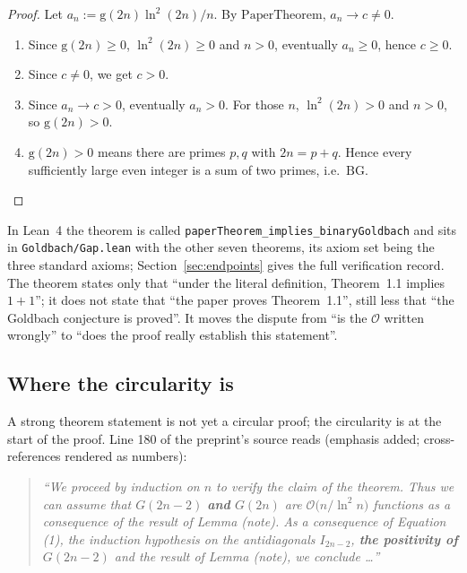 \documentclass[11pt,a4paper]{article}
\theoremstyle{plain}
\theoremstyle{definition}
\newcommand{\BG}{\mathrm{BG}}
\newcommand{\PaperTheorem}{\mathrm{PaperTheorem}}
\newcommand{\gcount}{\mathrm{g}}
\begin{document}
\begin{proof}
Let $a_n:=\gcount(2n)\ln^2(2n)/n$. By $\PaperTheorem$, $a_n\to c\ne0$.

\begin{enumerate}[label=(\roman*)]
\item Since $\gcount(2n)\ge0$, $\ln^2(2n)\ge0$ and $n>0$, eventually $a_n\ge0$, hence $c\ge0$.
\item Since $c\ne0$, we get $c>0$.
\item Since $a_n\to c>0$, eventually $a_n>0$. For those $n$, $\ln^2(2n)>0$ and $n>0$, so $\gcount(2n)>0$.
\item $\gcount(2n)>0$ means there are primes $p,q$ with $2n=p+q$. Hence every sufficiently large even integer is a sum of two primes, i.e.\ $\BG$.
\end{enumerate}
\end{proof}

In Lean~4 the theorem is called \texttt{paperTheorem\_implies\_binaryGoldbach} and sits in \texttt{Goldbach/Gap.lean} with the other seven theorems, its axiom set being the three standard axioms; Section~\ref{sec:endpoints} gives the full verification record. The theorem states only that ``under the literal definition, Theorem~1.1 implies $1+1$''; it does not state that ``the paper proves Theorem~1.1'', still less that ``the Goldbach conjecture is proved''. It moves the dispute from ``is the $\mathcal O$ written wrongly'' to ``does the proof really establish this statement''.

\subsection{Where the circularity is}
\label{sec:circularity}

A strong theorem statement is not yet a circular proof; the circularity is at the start of the proof. Line 180 of the preprint's source reads (emphasis added; cross-references rendered as numbers):

\begin{quote}\itshape
``We proceed by induction on $n$ to verify the claim of the theorem. Thus we can assume that
$G(2n-2)$ \textbf{and} $G(2n)$ are $\mathcal O\bigl(n/\ln^{2} n\bigr)$ functions as a
consequence of the result of Lemma (note). As a consequence of Equation (1), the induction
hypothesis on the antidiagonals $I_{2n-2}$, \textbf{the positivity of $G(2n-2)$} and the
result of Lemma (note), we conclude \ldots''
\end{quote}
\end{document}
